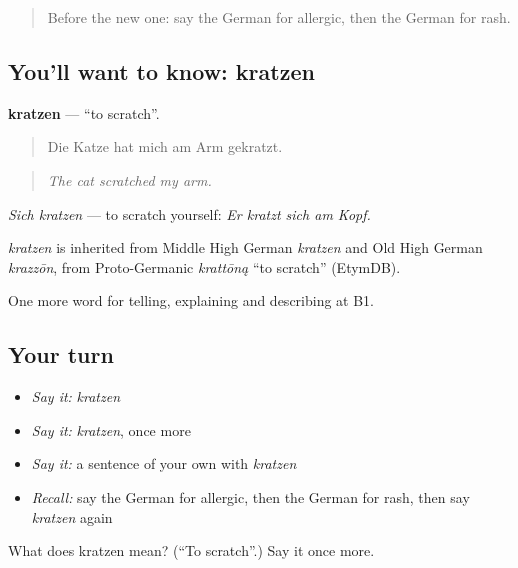 \begin{quote}
Before the new one: say the German for allergic, then the German for rash.
\end{quote}

\subsection*{You'll want to know: kratzen}
\textbf{kratzen} — \textquotedblleft{}to scratch\textquotedblright{}.

\begin{quote}
Die Katze hat mich am Arm gekratzt.
\end{quote}

\begin{quote}
\emph{The cat scratched my arm.}
\end{quote}

\emph{Sich kratzen} — to scratch yourself: \emph{Er kratzt sich am Kopf.}

\begin{cousinweb}
\emph{kratzen} is inherited from Middle High German \emph{kratzen} and Old High German \emph{krazzōn}, from Proto-Germanic \emph{krattōną} \textquotedblleft{}to scratch\textquotedblright{} (EtymDB).
\end{cousinweb}

\begin{grammarlens}[title={What you've built}]
One more word for telling, explaining and describing at B1.
\end{grammarlens}

\subsection*{Your turn}
\begin{itemize}
\raggedright
  \item \emph{Say it:} \emph{kratzen}
  \item \emph{Say it:} \emph{kratzen}, once more
  \item \emph{Say it:} a sentence of your own with \emph{kratzen}
  \item \emph{Recall:} say the German for allergic, then the German for rash, then say \emph{kratzen} again
\end{itemize}

\begin{tcolorbox}[breakable,colback=teal!4,colframe=teal!35!black,title={Before you move on}]
What does kratzen mean? (\textquotedblleft{}To scratch\textquotedblright{}.) Say it once more.
\end{tcolorbox}
